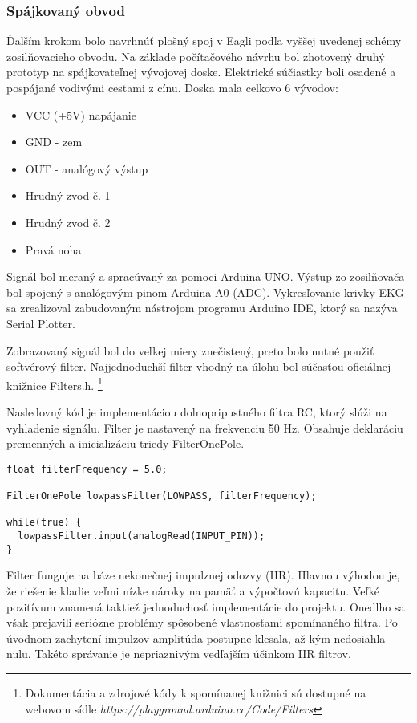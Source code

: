 \documentclass[titlepage,12pt]{article}
\begin{document}
\newpage
\subsubsection{Spájkovaný obvod}
Ďalším krokom bolo navrhnúť plošný spoj v Eagli podľa vyššej uvedenej schémy zosilňovacieho obvodu. Na základe počítačového návrhu bol zhotovený druhý prototyp na spájkovateľnej vývojovej doske. Elektrické súčiastky boli osadené a pospájané vodivými cestami z cínu. Doska mala celkovo 6 vývodov:
\begin{itemize}
	\item VCC (+5V) napájanie
	\item GND - zem
	\item OUT - analógový výstup
	\item Hrudný zvod č. 1
	\item Hrudný zvod č. 2
	\item Pravá noha
\end{itemize}
Signál bol meraný a spracúvaný za pomoci Arduina UNO. Výstup zo zosilňovača bol spojený s analógovým pinom Arduina A0 (ADC). Vykresľovanie krivky EKG sa zrealizoval zabudovaným nástrojom programu Arduino IDE, ktorý sa nazýva Serial Plotter.

Zobrazovaný signál bol do veľkej miery znečistený, preto bolo nutné použiť softvérový filter. Najjednoduchší filter vhodný na úlohu bol súčasťou oficiálnej knižnice Filters.h. \footnote{Dokumentácia a zdrojové kódy k spomínanej knižnici sú dostupné na webovom sídle \textit{https://playground.arduino.cc/Code/Filters}}

Nasledovný kód je implementáciou dolnopripustného filtra RC, ktorý slúži na vyhladenie signálu. Filter je nastavený na frekvenciu 50 Hz. Obsahuje deklaráciu premenných a inicializáciu triedy FilterOnePole.

\begin{lstlisting}
float filterFrequency = 5.0; 

FilterOnePole lowpassFilter(LOWPASS, filterFrequency);

while(true) {
  lowpassFilter.input(analogRead(INPUT_PIN));
}
\end{lstlisting}

Filter funguje na báze nekonečnej impulznej odozvy (IIR). Hlavnou výhodou je, že riešenie kladie veľmi nízke nároky na pamäť a výpočtovú kapacitu. Veľké pozitívum znamená taktiež jednoduchosť implementácie do projektu. Onedlho sa však prejavili seriózne problémy spôsobené vlastnosťami spomínaného filtra. Po úvodnom zachytení impulzov amplitúda postupne klesala, až kým nedosiahla nulu. Takéto správanie je nepriaznivým vedľajším účinkom IIR filtrov. 
\end{document}
